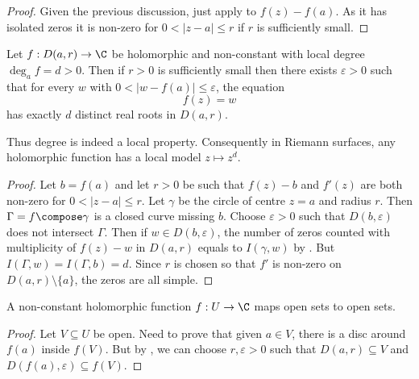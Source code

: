 \documentclass[a4paper]{article}
\begin{document}
\begin{proof}
  Given the previous discussion, just apply  to \(f(z) - f(a)\). As it has isolated zeros it is non-zero for \(0 < |z - a| \leq r\) if \(r\) is sufficiently small.
\end{proof}

\begin{theorem}
  \label{thm:local mapping degree}
  Let \(f: D(a, r) \to \C\) be holomorphic and non-constant with local degree \(\deg_a f = d > 0\). Then if \(r > 0\) is sufficiently small then there exists \(\varepsilon > 0\) such that for every \(w\) with \(0 < |w - f(a)| \leq \varepsilon\), the equation
  \[
    f(z) = w
  \]
  has exactly \(d\) distinct real roots in \(D(a, r)\).
\end{theorem}

Thus degree is indeed a local property. Consequently in Riemann surfaces, any holomorphic function has a local model \(z \mapsto z^d\).

\begin{proof}
  Let \(b = f(a)\) and let \(r > 0\) be such that \(f(z) - b\) and \(f'(z)\) are both non-zero for \(0 < |z - a| \leq r\). Let \(\gamma\) be the circle of centre \(z = a\) and radius \(r\). Then \(\Gamma = f \compose \gamma\) is a closed curve missing \(b\). Choose \(\varepsilon > 0\) such that \(D(b, \varepsilon)\) does not intersect \(\Gamma\). Then if \(w \in D(b, \varepsilon)\), the number of zeros counted with multiplicity of \(f(z) - w\) in \(D(a, r)\) equals to \(I(\gamma, w)\) by . But \(I(\Gamma, w) = I(\Gamma, b) = d\). Since \(r\) is chosen so that \(f'\) is non-zero on \(D(a, r) \setminus \{a\}\), the zeros are all simple.
\end{proof}

\begin{corollary}
  \label{cor:open mapping theorem}
  A non-constant holomorphic function \(f: U \to \C\) maps open sets to open sets.
\end{corollary}

\begin{proof}
  Let \(V \subseteq U\) be open. Need to prove that given \(a \in V\), there is a disc around \(f(a)\) inside \(f(V)\). But by , we can choose \(r, \varepsilon > 0\) such that \(D(a, r) \subseteq V\) and \(D(f(a), \varepsilon) \subseteq f(V)\).
\end{proof}
\end{document}
